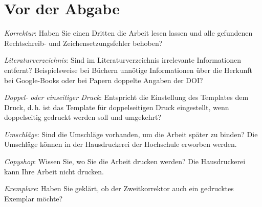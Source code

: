 \section{Vor der Abgabe}

\begin{checklist}
  \footnotesize
  \item \textit{Korrektur}: Haben Sie einen Dritten die Arbeit lesen lassen und alle gefundenen Rechtschreib- und Zeichensetzungsfehler behoben?
  \item \textit{Literaturverzeichnis}: Sind im Literaturverzeichnis irrelevante Informationen entfernt? Beispielsweise bei Büchern unnötige Informationen über die Herkunft bei Google-Books oder bei Papern doppelte Angaben der DOI?
  \item \textit{Doppel- oder einseitiger Druck}: Entspricht die Einstellung des Templates dem Druck, d.\,h. ist das Template für doppelseitigen Druck eingestellt, wenn doppelseitig gedruckt werden soll und umgekehrt?
  \item \textit{Umschläge}: Sind die Umschläge vorhanden, um die Arbeit später zu binden? Die Umschläge können in der Hausdruckerei der Hochschule erworben werden.
  \item \textit{Copyshop}: Wissen Sie, wo Sie die Arbeit drucken werden? Die Hausdruckerei kann Ihre Arbeit nicht drucken.
  \item \textit{Exemplare}: Haben Sie geklärt, ob der Zweitkorrektor auch ein gedrucktes Exemplar möchte?
\end{checklist}
